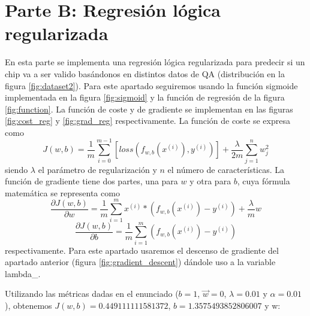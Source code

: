 \documentclass[6pt]{AiTex}
\begin{document}
\section{Parte B: Regresión lógica regularizada}

En esta parte se implementa una regresión lógica regularizada para predecir si un chip va a ser valido basándonos en distintos datos de QA (distribución en la figura \ref{fig:dataset2}). Para este apartado seguiremos usando la función sigmoide implementada en la figura \ref{fig:sigmoid} y la función de regresión de la figura \ref{fig:function}. La función de coste y de gradiente se implementan en las figuras \ref{fig:cost_reg} y \ref{fig:grad_reg} respectivamente. La función de coste se expresa como \[J(w,b) = \frac{1}{m} \sum_{i=0}^{m -1} [loss(f_{w,b}(x^{(i)}),y^{(i)})] + \frac{\lambda}{2m} \sum_{j=1}^{n} w_j^2\] siendo $\lambda$ el parámetro de regularización y $n$ el número de características. La función de gradiente tiene dos partes, una para $w$ y otra para $b$, cuya fórmula matemática se representa como \[\frac{\partial J(w,b)}{\partial w} = \frac{1}{m} \sum_{i=1}^{m} x^{(i)} * (f_{w,b}(x^{(i)}) - y^{(i)}) + \frac{\lambda}{m} w\] \[\frac{\partial J(w,b)}{\partial b} = \frac{1}{m} \sum_{i=1}^{m} (f_{w,b}(x^{(i)}) - y^{(i)})\] respectivamente. Para este apartado usaremos el descenso de gradiente del apartado anterior (figura \ref{fig:gradient_descent}) dándole uso a la variable lambda\_.

Utilizando las métricas dadas en el enunciado ($b = 1$, $\vec{w} = 0$, $\lambda = 0.01$ y $\alpha = 0.01$), obtenemos $J(w,b) = 0.449111111581372$, $b = 1.3575493852806007$ y w:
\end{document}

